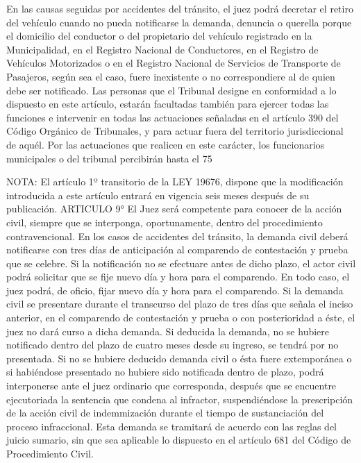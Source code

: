     En las causas seguidas por accidentes del tránsito, el juez podrá decretar el retiro del vehículo cuando no pueda notificarse la demanda, denuncia o querella porque el domicilio del conductor o del propietario del vehículo registrado en la Municipalidad, en el Registro Nacional de Conductores, en el Registro de Vehículos Motorizados o en el Registro Nacional de Servicios de Transporte de Pasajeros, según sea el caso, fuere inexistente o no correspondiere al de quien debe ser notificado.
    Las personas que el Tribunal designe en conformidad a lo dispuesto en este artículo, estarán facultadas también para ejercer todas las funciones e intervenir en todas las actuaciones señaladas en el artículo 390 del Código Orgánico de Tribunales, y para actuar fuera del territorio jurisdiccional de aquél. Por las actuaciones que realicen en este carácter, los funcionarios municipales o del tribunal percibirán hasta el 75%



NOTA:
    El artículo 1º transitorio de la LEY 19676, dispone que la modificación introducida a este artículo entrará en vigencia seis meses después de su publicación.
    ARTICULO 9° El Juez será competente para conocer de la acción civil, siempre que se interponga, oportunamente, dentro del procedimiento contravencional.
    En los casos de accidentes del tránsito, la demanda civil deberá notificarse con tres días de anticipación al comparendo de contestación y prueba que se celebre. Si la notificación no se efectuare antes de dicho plazo, el actor civil podrá solicitar que se fije nuevo día y hora para el comparendo. En todo caso, el juez podrá, de oficio, fijar nuevo día y hora para el comparendo.
    Si la demanda civil se presentare durante el transcurso del plazo de tres días que señala el inciso anterior, en el comparendo de contestación y prueba o con posterioridad a éste, el juez no dará curso a dicha demanda.
    Si deducida la demanda, no se hubiere notificado dentro del plazo de cuatro meses desde su ingreso, se tendrá por no presentada.
    Si no se hubiere deducido demanda civil o ésta fuere extemporánea o si habiéndose presentado no hubiere sido notificada dentro de plazo, podrá interponerse ante el juez ordinario que corresponda, después que se encuentre ejecutoriada la sentencia que condena al infractor, suspendiéndose la prescripción de la acción civil de indemmización durante el tiempo de sustanciación del proceso infraccional. Esta demanda se tramitará de acuerdo con las reglas del juicio sumario, sin que sea aplicable lo dispuesto en el artículo 681 del Código de Procedimiento Civil.


